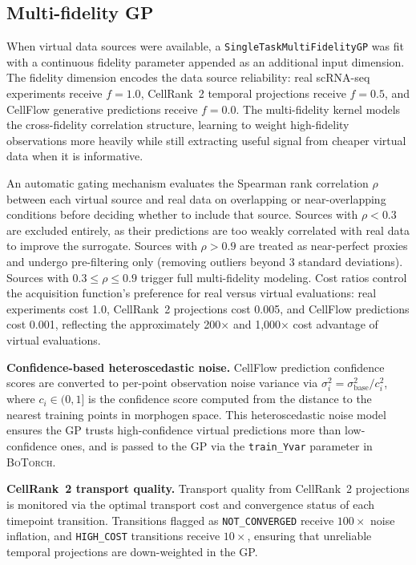\documentclass[times,twoside]{zHenriquesLab-StyleBioRxiv}
\newcommand{\botorch}{\textsc{BoTorch}}
\begin{document}
\subsection*{Multi-fidelity GP}

When virtual data sources were available, a \texttt{SingleTaskMultiFidelityGP} was fit with a continuous fidelity parameter appended as an additional input dimension. The fidelity dimension encodes the data source reliability: real scRNA-seq experiments receive $f{=}1.0$, CellRank~2 temporal projections receive $f{=}0.5$, and CellFlow generative predictions receive $f{=}0.0$. The multi-fidelity kernel models the cross-fidelity correlation structure, learning to weight high-fidelity observations more heavily while still extracting useful signal from cheaper virtual data when it is informative.

An automatic gating mechanism evaluates the Spearman rank correlation $\rho$ between each virtual source and real data on overlapping or near-overlapping conditions before deciding whether to include that source. Sources with $\rho < 0.3$ are excluded entirely, as their predictions are too weakly correlated with real data to improve the surrogate. Sources with $\rho > 0.9$ are treated as near-perfect proxies and undergo pre-filtering only (removing outliers beyond 3 standard deviations). Sources with $0.3 \leq \rho \leq 0.9$ trigger full multi-fidelity modeling. Cost ratios control the acquisition function's preference for real versus virtual evaluations: real experiments cost 1.0, CellRank~2 projections cost 0.005, and CellFlow predictions cost 0.001, reflecting the approximately 200$\times$ and 1,000$\times$ cost advantage of virtual evaluations.

\textbf{Confidence-based heteroscedastic noise.} CellFlow prediction confidence scores are converted to per-point observation noise variance via $\sigma^2_i = \sigma^2_\text{base} / c_i^2$, where $c_i \in (0, 1]$ is the confidence score computed from the distance to the nearest training points in morphogen space. This heteroscedastic noise model ensures the GP trusts high-confidence virtual predictions more than low-confidence ones, and is passed to the GP via the \texttt{train\_Yvar} parameter in \botorch{}.

\textbf{CellRank~2 transport quality.} Transport quality from CellRank~2 projections is monitored via the optimal transport cost and convergence status of each timepoint transition. Transitions flagged as \texttt{NOT\_CONVERGED} receive $100{\times}$ noise inflation, and \texttt{HIGH\_COST} transitions receive $10{\times}$, ensuring that unreliable temporal projections are down-weighted in the GP.
\end{document}
